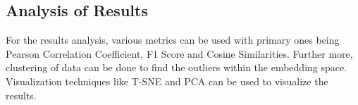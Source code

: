 \documentclass[10pt, oneside]{article}
\begin{document}
\begin{multicols}{2}
\section{Analysis of Results}

For the results analysis, various metrics can be used with primary ones being Pearson Correlation Coefficient, F1 Score and Cosine Similarities. Further more, clustering of data can be done to find the outliers within the embedding space. Visualization techniques like T-SNE and PCA can be used to visualize the results. 








\end{multicols}
\end{document}
